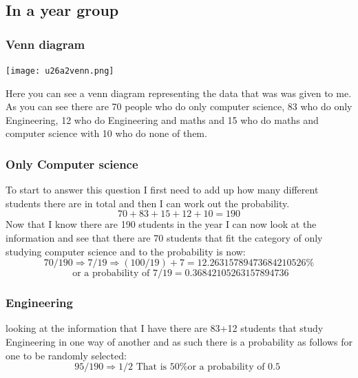 \documentclass{article}
\begin{document}
\subsection{In a year group}
\subsubsection{Venn diagram}

\texttt{[image: u26a2venn.png]}

Here you can see a venn diagram representing the data that was was given to me. As you can see there are 70 people who do only  computer science, 83 who do only Engineering, 12 who do Engineering and maths and 15 who do maths and computer science with 10 who do none of them. 

\subsubsection{Only Computer science}
To start to answer this question I first need to add up how many different students there are in total and then I can work out the probability. 
\[
	70+83+15+12+10 = 190
\]
Now that I know there are 190 students in the year I can now look at the information and see that there are 70 students that fit the category of only studying computer science and to the probability is now:
\[
	70/190 \Rightarrow 7/19 \Rightarrow (100/ 19)+7 = 12.26315789473684210526\% 
\]
\[
	\mbox{ or a probability of } 7/19 = 0.36842105263157894736  
\]
\subsubsection{Engineering}
looking at the information that I have there are 83+12 students that study Engineering in one way of another and as such there is a probability as follows for one to be randomly selected:
\[
	95 / 190 \Rightarrow 1/2 \mbox{ That is 50\% or a probability of 0.5 }
\]
\end{document}
